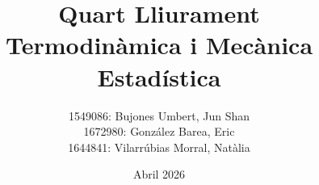 \documentclass[a4paper, 10pt]{article}
\begin{document}
	\title{\Huge{\textbf{Quart Lliurament}} \\ \vspace{0.2cm} \large{\textbf{Termodinàmica i Mecànica Estadística}}}
	
	\author{\small{1549086: Bujones Umbert, Jun Shan} \\
		\small{1672980: González Barea, Eric} \\
		\small{1644841: Vilarrúbias Morral, Natàlia}}
	\date{Abril 2026}
	\maketitle
	
	\thispagestyle{fancy}
\end{document}

